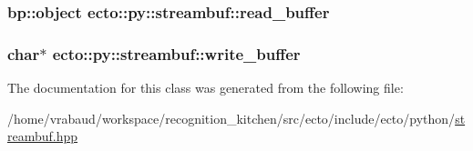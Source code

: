 \subsubsection[{read\+\_\+buffer}]{\setlength{\rightskip}{0pt plus 5cm}bp\+::object ecto\+::py\+::streambuf\+::read\+\_\+buffer\hspace{0.3cm}{\ttfamily [private]}}\label{classecto_1_1py_1_1streambuf_ac239012691e5d3485572159a53600005}
\hypertarget{classecto_1_1py_1_1streambuf_a331e541fac616ac9ac3a81fb117057c6}{}
\subsubsection[{write\+\_\+buffer}]{\setlength{\rightskip}{0pt plus 5cm}char$\ast$ ecto\+::py\+::streambuf\+::write\+\_\+buffer\hspace{0.3cm}{\ttfamily [private]}}\label{classecto_1_1py_1_1streambuf_a331e541fac616ac9ac3a81fb117057c6}


The documentation for this class was generated from the following file\+:\begin{DoxyCompactItemize}
\item 
/home/vrabaud/workspace/recognition\+\_\+kitchen/src/ecto/include/ecto/python/\hyperlink{streambuf_8hpp}{streambuf.\+hpp}\end{DoxyCompactItemize}
